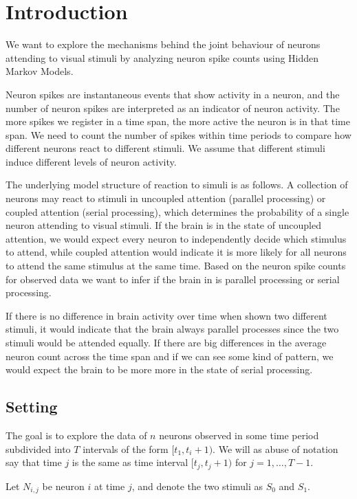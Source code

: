 \section{Introduction}
We want to explore the mechanisms behind the joint behaviour of neurons attending to visual stimuli by analyzing neuron spike counts using Hidden Markov Models.

Neuron spikes are instantaneous events that show activity in a neuron, and the number of neuron spikes are interpreted as an indicator of neuron activity. The more spikes we register in a time span, the more active the neuron is in that time span. We need to count the number of spikes within time periods to compare how different neurons react to different stimuli. We assume that different stimuli induce different levels of neuron activity.

The underlying model structure of reaction to simuli is as follows. A collection of neurons may react to stimuli in uncoupled attention (parallel processing) or coupled attention (serial processing), which determines the probability of a single neuron attending to visual stimuli. If the brain is in the state of uncoupled attention, we would expect every neuron to independently decide which stimulus to attend, while coupled attention would indicate it is more likely for all neurons to attend the same stimulus at the same time. Based on the neuron spike counts for observed data we want to infer if the brain in is parallel processing or serial processing.

If there is no difference in brain activity over time when shown two different stimuli, it would indicate that the brain always parallel processes since the two stimuli would be attended equally. If there are big differences in the average neuron count across the time span and if we can see some kind of pattern, we would expect the brain to be more more in the state of serial processing.

\subsection{Setting}
The goal is to explore the data of $n$ neurons observed in some time period subdivided into $T$ intervals of the form $[t_1, t_i+1)$. We will as abuse of notation say that time $j$ is the same as time interval $[t_j, t_j+1)$ for $j = 1,\ldots, T-1$.

Let $N_{i,j}$ be neuron $i$ at time $j$, and denote the two stimuli  as $S_0$ and $S_1$.



